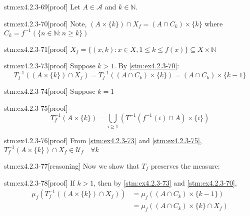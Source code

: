 \begin{stm}{stm:ex4.2.3-69}[proof]
Let $A \in \mathcal{A}$ and $k \in \mathbb{N}$.
\end{stm}

\begin{stm}{stm:ex4.2.3-70}[proof]
Note, $(A \times \{k\}) \cap X_f = (A \cap C_k) \times \{k\}$ where $C_k = f^{-1}(\{n \in \mathbb{N} : n \ge k\})$
\end{stm}

\begin{stm}{stm:ex4.2.3-71}[proof]
$X_f = \{(x,k) : x \in X, 1 \le k \le f(x)\} \subseteq X \times \mathbb{N}$
\end{stm}

\begin{stm}{stm:ex4.2.3-73}[proof]
Suppose $k > 1$. By \ref{stm:ex4.2.3-70}:
\[
T_f^{-1}((A \times \{k\}) \cap X_f) = T_f^{-1}((A \cap C_k) \times \{k\}) = (A \cap C_k) \times \{k-1\}
\]
\end{stm}

\begin{stm}{stm:ex4.2.3-74}[proof]
Suppose $k = 1$
\end{stm}

\begin{stm}{stm:ex4.2.3-75}[proof]
\[
T_f^{-1}(A \times \{k\}) = \bigcup_{i \ge 1} (T^{-1}(f^{-1}(i) \cap A) \times \{i\})
\]
\end{stm}

\begin{stm}{stm:ex4.2.3-76}[proof]
From \ref{stm:ex4.2.3-73} and \ref{stm:ex4.2.3-75}, $T_f^{-1}(A \times \{k\}) \cap X_f \in \mathcal{U}_f \quad \forall k$
\end{stm}

\begin{stm}{stm:ex4.2.3-77}[reasoning]
Now we show that $T_f$ preserves the measure:
\end{stm}

\begin{stm}{stm:ex4.2.3-78}[proof]
If $k > 1$, then by \ref{stm:ex4.2.3-73} and \ref{stm:ex4.2.3-70},
\begin{align*}
\mu_f(T_f^{-1}((A \times \{k\}) \cap X_f)) &= \mu_f((A \cap C_k) \times \{k-1\}) \\
&= \mu_f((A \cap C_k) \times \{k\} \cap X_f)
\end{align*}
\end{stm}

